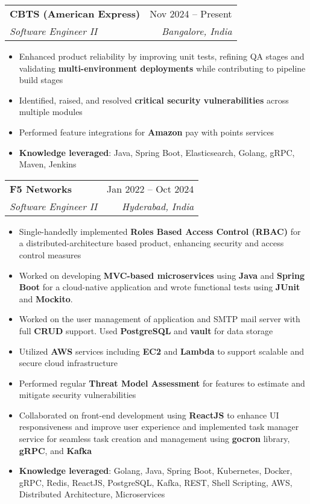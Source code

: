 \documentclass[letterpaper,12pt]{article}
\makeatletter
\newcommand{\resumeItem}[1]{
  \item\small{
    {#1 \vspace{-2pt}}
  }
}
\newcommand{\resumeSubheading}[4]{
  \vspace{-2pt}\item
    \begin{tabular*}{0.97\textwidth}[t]{l@{\extracolsep{\fill}}r}
      \textbf{#1} & #2 \\
      \textit{\small#3} & \textit{\small #4} \\
    \end{tabular*}\vspace{-7pt}
}
\newcommand{\resumeItemListStart}{\begin{itemize}}
\newcommand{\resumeItemListEnd}{\end{itemize}\vspace{-5pt}}
\makeatother
\begin{document}
	\resumeSubheading
      {CBTS (American Express)}{Nov 2024 -- Present}
      {Software Engineer II}{Bangalore, India}
      \resumeItemListStart
        \resumeItem{Enhanced product reliability by improving unit tests, refining QA stages and validating \textbf{multi-environment deployments} while contributing to pipeline build stages}
		\resumeItem{Identified, raised, and resolved \textbf{critical security vulnerabilities} across multiple modules}
        \resumeItem{Performed feature integrations for \textbf{Amazon} pay with points services}\phantom{GCP, Terraform, Spring}
        \resumeItem{\textbf{Knowledge leveraged}: Java, Spring Boot, Elasticsearch, Golang, gRPC, Maven, Jenkins}
      \resumeItemListEnd
          \vspace{10pt}
          
    \resumeSubheading
      {F5 Networks}{Jan 2022 -- Oct 2024}
      {Software Engineer II}{Hyderabad, India}
      \resumeItemListStart
        \resumeItem{Single-handedly implemented \textbf{Roles Based Access Control (RBAC)} for \phantom{cloud, GCP, Python} \\a distributed-architecture based product,
enhancing security and access control measures \phantom{Java, Redis}}
		\resumeItem{Worked on developing \textbf{MVC-based microservices} using \textbf{Java} and \textbf{Spring Boot} for a cloud-native application and wrote functional tests using \textbf{JUnit} and \textbf{Mockito}. \phantom{ Servlets, JSP, Maven, Terraform}}
        \resumeItem{Worked on the user management of application and SMTP mail server with full \textbf{CRUD} support. Used \textbf{PostgreSQL} and \textbf{vault} for data storage \phantom{SDLC, Agile, Jira, Oracle PL/SQL}}
        \resumeItem{Utilized \textbf{AWS} services including \textbf{EC2} and \textbf{Lambda} to support scalable and secure cloud infrastructure}
        \resumeItem{Performed regular \textbf{Threat Model Assessment} for features to estimate and mitigate security vulnerabilities \phantom{Computer Networks, IPV4/6,TCP,UDP,HTTP,L4-L7, DNS, Openshift}}
        \resumeItem{Collaborated on front-end development using \textbf{ReactJS} to enhance UI responsiveness and improve user experience and implemented task manager service for seamless task creation and management using \textbf{gocron} library, \textbf{gRPC}, and \textbf{Kafka} \phantom{Cloud, AWS, Spring, SDLC, Agile, Jira}}
        \resumeItem{\textbf{Knowledge leveraged}: Golang, Java, Spring Boot, Kubernetes, Docker, gRPC, Redis, ReactJS, PostgreSQL, Kafka, REST, Shell Scripting, AWS, Distributed Architecture, Microservices}
      \resumeItemListEnd
          \vspace{10pt}
\end{document}
